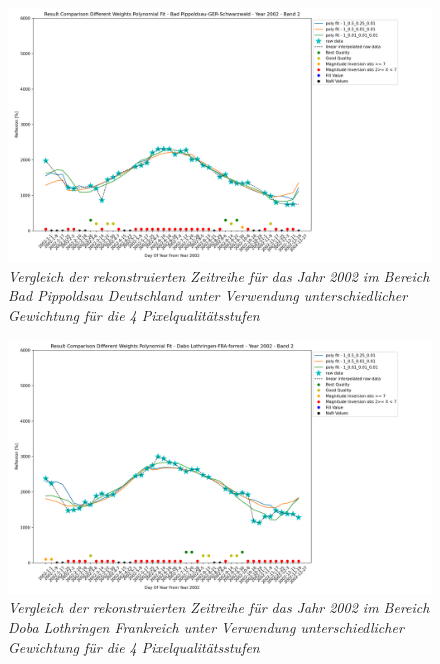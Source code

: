 \documentclass[11pt]{report}
\begin{document}
\begin{figure}[H]
\hspace*{-2.5cm}
\includegraphics[scale=0.55]{./Grafiken/Fitting/Fitting_method_comparison/selected_comparisons_poly/Fit_comparison_poly_all_Bad Pippoldsau-GER-Schwarzwald_2002.png}
\caption{\textit{Vergleich der rekonstruierten Zeitreihe für das Jahr 2002 im Bereich Bad Pippoldsau Deutschland unter Verwendung unterschiedlicher Gewichtung für die 4 Pixelqualitätsstufen}}
\label{fig:compare_fit_sg_raf_it_2002_ger_pip}
\end{figure}
\begin{figure}[H]
\hspace*{-2.5cm}
\includegraphics[scale=0.55]{./Grafiken/Fitting/Fitting_method_comparison/selected_comparisons_poly/Fit_comparison_poly_all_Dabo Lothringen-FRA-forrest_2002.png}
\caption{\textit{Vergleich der rekonstruierten Zeitreihe für das Jahr 2002 im Bereich Doba Lothringen Frankreich unter Verwendung unterschiedlicher Gewichtung für die 4 Pixelqualitätsstufen}}
\label{fig:compare_fit_sg_raf_it_2002_fra_doba}
\end{figure}
\end{document}
